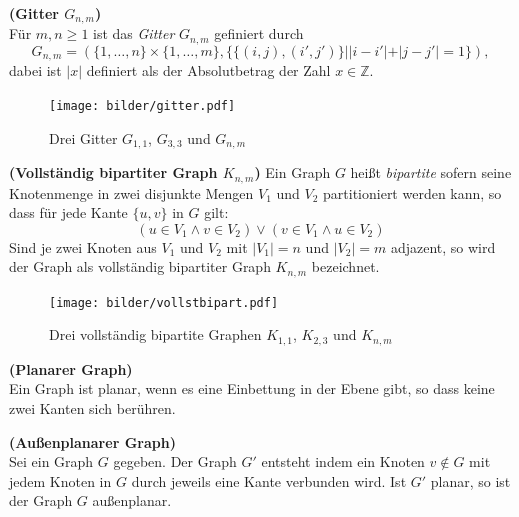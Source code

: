 \begin{defi}{\textbf{(Gitter $G_{n,m}$)}}\\
Für $m,n \geq 1$ ist das \emph{Gitter} $G_{n,m}$ gefiniert durch $$G_{n,m}=(\{1,\ldots,n\}\times\{1,\ldots ,m\},\{\{(i,j),(i',j')\}||i-i'|+|j-j'|=1\} ),$$ dabei ist $|x|$ definiert als der Absolutbetrag der Zahl $x \in \mathbb{Z}$.\cite{exaktealgorithmenfuerschweregraphenprobleme} 
\end{defi}
\vspace{-4mm}
\begin{figure}[h!]
		\centering 		 
   \texttt{[image: bilder/gitter.pdf]}
	\caption{Drei Gitter $G_{1,1}$, $G_{3,3}$ und $G_{n,m}$}
  	 \end{figure}

\begin{defi}{\textbf{(Vollständig bipartiter Graph $K_{n,m}$)}}\newline
Ein Graph $G$ heißt \emph{bipartite} sofern seine Knotenmenge in zwei disjunkte Mengen $V_1$ und $V_2$ partitioniert werden kann, so dass für jede Kante $\{u,v\}$ in $G$ gilt: $$(u \in V_1 \wedge v \in V_2)\vee (v \in V_1 \wedge u \in V_2)$$Sind je zwei Knoten aus $V_1$ und $V_2$ mit $|V_1|=n$ und $|V_2|=m$ adjazent, so wird der Graph als vollständig bipartiter Graph $K_{n,m}$ bezeichnet. \end{defi}
\begin{figure}[h!]
		\centering 		 
   \texttt{[image: bilder/vollstbipart.pdf]}
	\caption{Drei vollständig bipartite Graphen $K_{1,1}$, $K_{2,3}$ und $K_{n,m}$}
  	 \end{figure}


\begin{defi}{\textbf{(Planarer Graph)}}\\
Ein Graph ist planar, wenn es eine Einbettung in der Ebene gibt, so dass keine zwei Kanten sich berühren. \end{defi}


\begin{defi}{\textbf{(Außenplanarer Graph)}}\\
Sei ein Graph $G$ gegeben. Der Graph $G'$ entsteht indem ein Knoten $v \notin G$ mit jedem Knoten in $G$ durch jeweils eine Kante verbunden wird. Ist $G'$ planar, so ist der Graph $G$ außenplanar. 
\end{defi}

